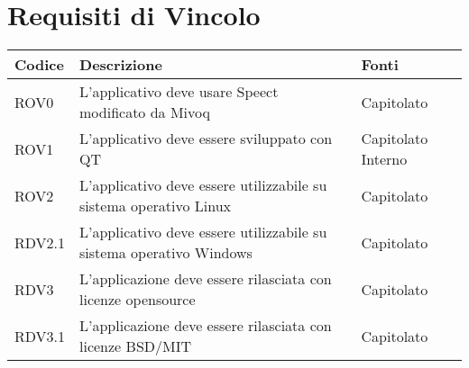 \documentclass[../AnalisideiRequisiti.tex]{subfiles}
\begin{document}
	\section{Requisiti di Vincolo}
		\begin{longtable}{| p{3cm} | p{6cm} | p{3cm} |}
	\hline
	\textbf{Codice} & \textbf{Descrizione} & \textbf{Fonti}\\
	\hline
	\endhead
				\newline ROV0&
			\newline 
			L'applicativo deve usare Speect modificato da Mivoq &
			\newline Capitolato
			\\[1em]
			\hline	
			\newline 
			ROV1&
			\newline 
			L'applicativo deve essere sviluppato con QT &
			\newline Capitolato
			\newline Interno
			\\[1em]
			\hline
			\newline 
			ROV2&
			\newline 
			L'applicativo deve essere utilizzabile su sistema operativo Linux&
			\newline Capitolato
			\\[1em]
			\hline
			\newline
			RDV2.1&
			\newline 
			L'applicativo deve essere utilizzabile su sistema operativo Windows&
			\newline Capitolato
			\\[1em]
			\hline
			\newline
			RDV3&
			\newline 
			L'applicazione deve essere rilasciata con licenze opensource&
			\newline Capitolato
			\\[1em]
			\hline	
			RDV3.1&
			\newline 
			L'applicazione deve essere rilasciata con licenze BSD/MIT &
			\newline Capitolato
			\\[1em]
			\hline
	\end{longtable}
\end{document}

